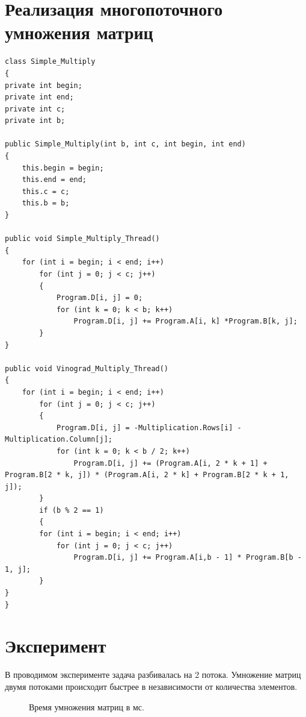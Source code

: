\documentclass[a4paper,12pt]{article}
\begin{document}
\section{Реализация многопоточного умножения матриц}
\begin{lstlisting}[label=some-code,caption={Класс для описания многопоточного умножения}]
class Simple_Multiply
{
private int begin;
private int end;
private int c;
private int b;

public Simple_Multiply(int b, int c, int begin, int end)
{
	this.begin = begin;
	this.end = end;
	this.c = c;
	this.b = b;
}

public void Simple_Multiply_Thread()
{
	for (int i = begin; i < end; i++)
		for (int j = 0; j < c; j++)
		{
			Program.D[i, j] = 0;
			for (int k = 0; k < b; k++)
				Program.D[i, j] += Program.A[i, k] *Program.B[k, j];
		}
}

public void Vinograd_Multiply_Thread()
{
	for (int i = begin; i < end; i++)
		for (int j = 0; j < c; j++)
		{
			Program.D[i, j] = -Multiplication.Rows[i] - Multiplication.Column[j];
			for (int k = 0; k < b / 2; k++)
				Program.D[i, j] += (Program.A[i, 2 * k + 1] + Program.B[2 * k, j]) * (Program.A[i, 2 * k] + Program.B[2 * k + 1, j]);
		}
		if (b % 2 == 1)
		{
		for (int i = begin; i < end; i++)
			for (int j = 0; j < c; j++)
				Program.D[i, j] += Program.A[i,b - 1] * Program.B[b - 1, j];
		}
}
}
\end{lstlisting}

\section{Эксперимент}
В проводимом эксперименте задача разбивалась на 2 потока. Умножение матриц двумя потоками происходит быстрее в независимости от количества элементов.
\begin{figure}[H]
	\noindent{}
	\caption{Время умножения матриц в мс.}
\end{figure}
\end{document}
